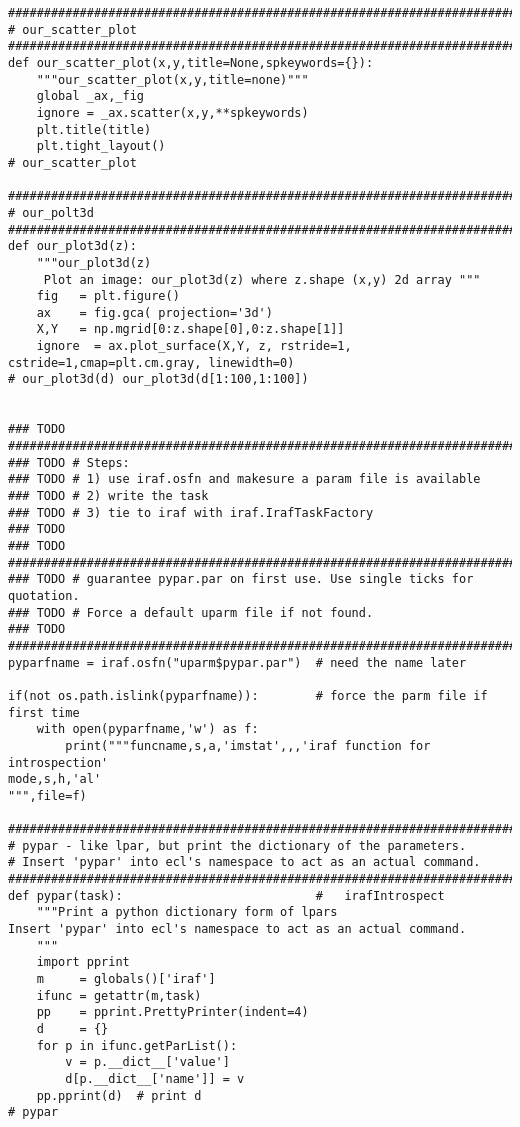 {\begin{verbatim}
#############################################################################
# our_scatter_plot
#############################################################################
def our_scatter_plot(x,y,title=None,spkeywords={}):
    """our_scatter_plot(x,y,title=none)"""
    global _ax,_fig
    ignore = _ax.scatter(x,y,**spkeywords)
    plt.title(title)
    plt.tight_layout()
# our_scatter_plot

#############################################################################
# our_polt3d
#############################################################################
def our_plot3d(z):
    """our_plot3d(z)
     Plot an image: our_plot3d(z) where z.shape (x,y) 2d array """
    fig   = plt.figure()
    ax    = fig.gca( projection='3d')
    X,Y   = np.mgrid[0:z.shape[0],0:z.shape[1]]
    ignore  = ax.plot_surface(X,Y, z, rstride=1, cstride=1,cmap=plt.cm.gray, linewidth=0)
# our_plot3d(d) our_plot3d(d[1:100,1:100])


### TODO #############################################################################
### TODO # Steps:
### TODO # 1) use iraf.osfn and makesure a param file is available
### TODO # 2) write the task
### TODO # 3) tie to iraf with iraf.IrafTaskFactory
### TODO
### TODO #############################################################################
### TODO # guarantee pypar.par on first use. Use single ticks for quotation.
### TODO # Force a default uparm file if not found.
### TODO #############################################################################
pyparfname = iraf.osfn("uparm$pypar.par")  # need the name later

if(not os.path.islink(pyparfname)):        # force the parm file if first time
    with open(pyparfname,'w') as f:
        print("""funcname,s,a,'imstat',,,'iraf function for introspection'
mode,s,h,'al'
""",file=f)

#############################################################################
# pypar - like lpar, but print the dictionary of the parameters.
# Insert 'pypar' into ecl's namespace to act as an actual command.
#############################################################################
def pypar(task):                           #   irafIntrospect
    """Print a python dictionary form of lpars
Insert 'pypar' into ecl's namespace to act as an actual command.
    """
    import pprint
    m     = globals()['iraf']
    ifunc = getattr(m,task)
    pp    = pprint.PrettyPrinter(indent=4)
    d     = {}
    for p in ifunc.getParList():
        v = p.__dict__['value']
        d[p.__dict__['name']] = v
    pp.pprint(d)  # print d
# pypar


\end{verbatim}}
